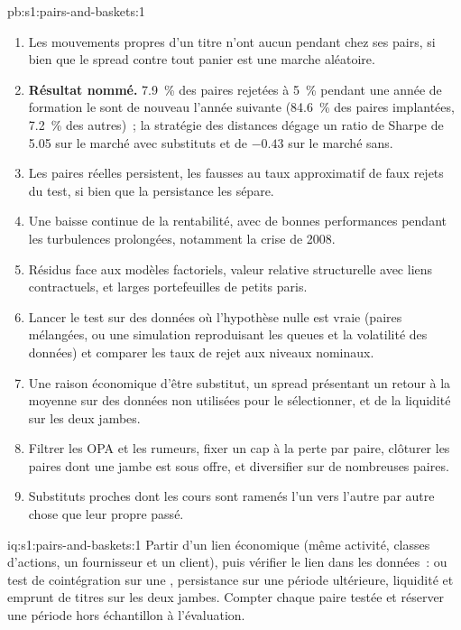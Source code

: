 \begin{solution}{pb:s1:pairs-and-baskets:1}
\begin{enumerate}
\item Les mouvements propres d'un titre n'ont aucun pendant chez ses pairs, si bien que le spread contre tout panier est une marche aléatoire.
\item \textbf{Résultat nommé.} 7.9~\% des paires rejetées à 5~\% pendant une année de formation le sont de nouveau l'année suivante (84.6~\% des paires implantées, 7.2~\% des
autres)~; la stratégie des distances dégage un ratio de Sharpe de 5.05 sur le marché avec substituts et de $-0.43$ sur le marché sans.
\item Les paires réelles persistent, les fausses au taux approximatif de faux rejets du test, si bien que la persistance les sépare.
\item Une baisse continue de la rentabilité, avec de bonnes performances pendant les turbulences prolongées, notamment la crise de 2008.
\item Résidus face aux modèles factoriels, valeur relative structurelle avec liens contractuels, et larges portefeuilles de petits paris.
\item Lancer le test sur des données où l'hypothèse nulle est vraie (paires mélangées, ou une simulation reproduisant les queues et la volatilité des données) et comparer les taux de rejet aux
niveaux nominaux.
\item Une raison économique d'être substitut, un spread présentant un retour à la moyenne sur des données non utilisées pour le sélectionner, et de la liquidité sur les deux jambes.
\item Filtrer les OPA et les rumeurs, fixer un cap à la perte par paire, clôturer les paires dont une jambe est sous offre, et diversifier sur de nombreuses paires.
\item Substituts proches dont les cours sont ramenés l'un vers l'autre par autre chose que leur propre passé.
\end{enumerate}
\end{solution}

\begin{solution}{iq:s1:pairs-and-baskets:1}
Partir d'un lien économique (même activité, classes d'actions, un fournisseur et un client), puis vérifier le lien dans les données~:  ou test de cointégration sur
une , persistance sur une période ultérieure, liquidité et emprunt de titres sur les deux jambes. Compter chaque paire testée et réserver une période hors échantillon à l'évaluation.
\end{solution}

